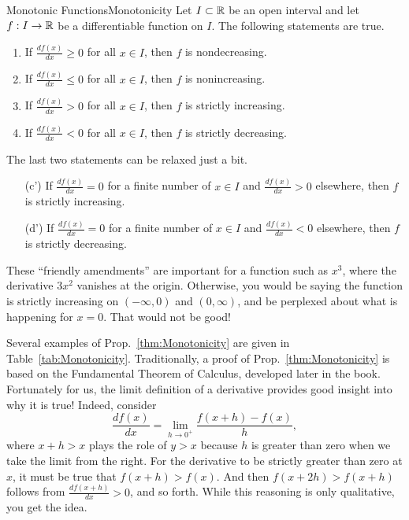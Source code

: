 \vspace*{.2cm}

\begin{propColor}{Monotonic Functions}{Monotonicity}
Let $I \subset \mathbb R$ be an open interval and let $f:I \to \mathbb R$ be a differentiable function on $I$. The following statements are true. 
\begin{enumerate}
\renewcommand{\labelenumi}{(\alph{enumi})}
\setlength{\itemsep}{.2cm}
    \item If $\frac{df(x)}{dx} \ge 0$ for all $x\in I$, then $f$ is nondecreasing.
    \item If $\frac{df(x)}{dx} \le 0$ for all $x\in I$, then $f$ is nonincreasing.
    \item If $\frac{df(x)}{dx} > 0$ for all $x\in I$, then $f$ is strictly increasing.
    \item If $\frac{df(x)}{dx} < 0$ for all $x\in I$, then $f$ is strictly decreasing.
\end{enumerate}

The last two statements can be relaxed just a bit. 
\begin{enumerate}
\renewcommand{\labelenumi}{(\alph{enumi})}
\setlength{\itemsep}{.2cm}
    \item[(c')] If $\frac{df(x)}{dx} =0 $ for a finite number of $x\in I$ and  $\frac{df(x)}{dx} > 0 $ elsewhere, then $f$ is strictly increasing.
    \item[(d')] If $\frac{df(x)}{dx} =0 $ for a finite number of $x\in I$ and  $\frac{df(x)}{dx} < 0 $ elsewhere, then $f$ is strictly decreasing.
\end{enumerate}
These ``friendly amendments'' are important for a function such as $x^3$, where the derivative $3 x^2$  vanishes at the origin. Otherwise, you would be saying the function is strictly increasing on $(-\infty, 0)$ and $(0, \infty)$, and be perplexed about what is happening for $x=0$. That would not be good!    
\end{propColor}

\vspace*{.2cm}

Several examples of Prop.~\ref{thm:Monotonicity} are given in Table~\ref{tab:Monotonicity}. Traditionally, a proof of Prop.~\ref{thm:Monotonicity} is based on the Fundamental Theorem of Calculus, developed later in the book. Fortunately for us, the limit definition of a derivative provides good insight into why it is true! Indeed, consider
$$\frac{df(x)}{dx} = \lim_{h \to 0^+} \frac{f(x+h) -f(x)}{h},$$
where $x+h >x$ plays the role of $y>x$ because $h$ is greater than zero when we take the limit from the right. For the derivative to be strictly greater than zero at $x$, it must be true that $f(x+h) > f(x)$. And then $f(x+2h) > f(x +h)$ follows from $\frac{df(x+h)}{dx} >0$, and so forth. While this reasoning is only qualitative, you get the idea. 





